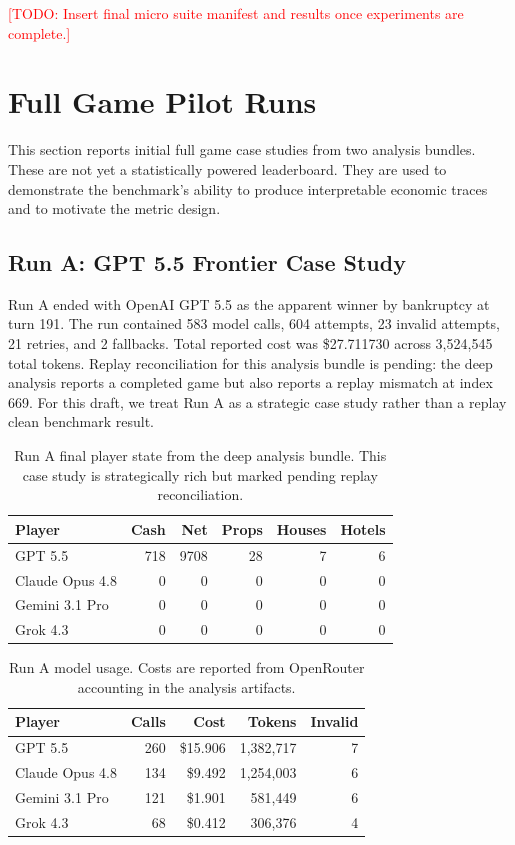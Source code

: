 \documentclass[conference]{IEEEtran}
\newcommand{\todo}[1]{\textcolor{red}{[TODO: #1]}}
\begin{document}
\todo{Insert final micro suite manifest and results once experiments are complete.}

\section{Full Game Pilot Runs}
\label{sec:pilot}

This section reports initial full game case studies from two analysis bundles. These are not yet a statistically powered leaderboard. They are used to demonstrate the benchmark's ability to produce interpretable economic traces and to motivate the metric design.

\subsection{Run A: GPT 5.5 Frontier Case Study}

Run A ended with OpenAI GPT 5.5 as the apparent winner by bankruptcy at turn 191. The run contained 583 model calls, 604 attempts, 23 invalid attempts, 21 retries, and 2 fallbacks. Total reported cost was \$27.711730 across 3,524,545 total tokens. Replay reconciliation for this analysis bundle is pending: the deep analysis reports a completed game but also reports a replay mismatch at index 669. For this draft, we treat Run A as a strategic case study rather than a replay clean benchmark result.

\begin{table}[t]
\caption{Run A final player state from the deep analysis bundle. This case study is strategically rich but marked pending replay reconciliation.}
\label{tab:run_a_final}
\centering
\begin{tabular}{lrrrrr}
\toprule
\textbf{Player} & \textbf{Cash} & \textbf{Net} & \textbf{Props} & \textbf{Houses} & \textbf{Hotels} \\
\midrule
GPT 5.5 & 718 & 9708 & 28 & 7 & 6 \\
Claude Opus 4.8 & 0 & 0 & 0 & 0 & 0 \\
Gemini 3.1 Pro & 0 & 0 & 0 & 0 & 0 \\
Grok 4.3 & 0 & 0 & 0 & 0 & 0 \\
\bottomrule
\end{tabular}
\end{table}

\begin{table}[t]
\caption{Run A model usage. Costs are reported from OpenRouter accounting in the analysis artifacts.}
\label{tab:run_a_usage}
\centering
\begin{tabular}{lrrrr}
\toprule
\textbf{Player} & \textbf{Calls} & \textbf{Cost} & \textbf{Tokens} & \textbf{Invalid} \\
\midrule
GPT 5.5 & 260 & \$15.906 & 1,382,717 & 7 \\
Claude Opus 4.8 & 134 & \$9.492 & 1,254,003 & 6 \\
Gemini 3.1 Pro & 121 & \$1.901 & 581,449 & 6 \\
Grok 4.3 & 68 & \$0.412 & 306,376 & 4 \\
\bottomrule
\end{tabular}
\end{table}
\end{document}
